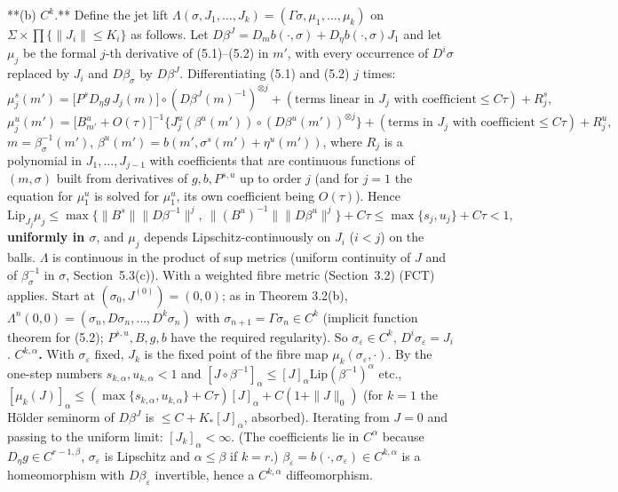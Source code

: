 \documentclass[11pt,a4paper]{article}
\theoremstyle{plain}
\theoremstyle{definition}
\theoremstyle{remark}
\numberwithin{equation}{section}
\numberwithin{figure}{section}
\begin{document}
**(b) $C^k$.** Define the jet lift $\Lambda(\sigma,J_1,\dots,J_k)=(\Gamma\sigma,\mu_1,\dots,\mu_k)$ on $\Sigma\times\prod\{\|J_i\|\le K_i\}$ as follows. Let $D\beta^J=D_mb(\cdot,\sigma)+D_\eta b(\cdot,\sigma)J_1$ and let $\mu_j$ be the formal $j$-th derivative of (5.1)–(5.2) in $m'$, with every occurrence of $D^i\sigma$ replaced by $J_i$ and $D\beta_\sigma$ by $D\beta^J$. Differentiating (5.1) and (5.2) $j$ times:
\[
\mu^s_j(m')=\big[P^sD_\eta g\,J_j(m)\big]\circ(D\beta^{J}(m)^{-1})^{\otimes j}+(\text{terms linear in }J_j\text{ with coefficient}\le C\tau)+R^s_j,
\]
\[
\mu^u_j(m')=\big[B^u_{m'}+O(\tau)\big]^{-1}\Big\{J_j^u(\beta^u(m'))\circ(D\beta^u(m'))^{\otimes j}\Big\}+(\text{terms in }J_j\text{ with coefficient}\le C\tau)+R^u_j,
\]
$m=\beta_\sigma^{-1}(m')$, $\beta^u(m')=b(m',\sigma^s(m')+\eta^u(m'))$, where $R_j$ is a polynomial in $J_1,\dots,J_{j-1}$ with coefficients that are continuous functions of $(m,\sigma)$ built from derivatives of $g,b,P^{s,u}$ up to order $j$ (and for $j=1$ the equation for $\mu^u_1$ is solved for $\mu^u_1$, its own coefficient being $O(\tau)$). Hence
\[
\mathrm{Lip}_{J_j}\mu_j\le\max\{\|B^s\|\|D\beta^{-1}\|^j,\ \|(B^u)^{-1}\|\|D\beta^u\|^j\}+C\tau\le\max\{s_j,u_j\}+C\tau<1,
\]
\textbf{uniformly in $\sigma$}, and $\mu_j$ depends Lipschitz-continuously on $J_i$ ($i<j$) on the balls. $\Lambda$ is continuous in the product of sup metrics (uniform continuity of $J$ and of $\beta_\sigma^{-1}$ in $\sigma$, Section~5.3(c)). With a weighted fibre metric (Section~3.2) (FCT) applies. Start at $(\sigma_0,J^{(0)})=(0,0)$; as in Theorem 3.2(b), $\Lambda^n(0,0)=(\sigma_n,D\sigma_n,\dots,D^k\sigma_n)$ with $\sigma_{n+1}=\Gamma\sigma_n\in C^{k}$ (implicit function theorem for (5.2); $P^{s,u},B,g,b$ have the required regularity). So $\sigma_\varepsilon\in C^k$, $D^i\sigma_\varepsilon=J_i$.
\textbf{$C^{k,\alpha}$.} With $\sigma_\varepsilon$ fixed, $J_k$ is the fixed point of the fibre map $\mu_k(\sigma_\varepsilon,\cdot)$. By the one-step numbers $s_{k,\alpha},u_{k,\alpha}<1$ and $[J\circ\beta^{-1}]_\alpha\le[J]_\alpha\mathrm{Lip}(\beta^{-1})^\alpha$ etc., $[\mu_k(J)]_\alpha\le(\max\{s_{k,\alpha},u_{k,\alpha}\}+C\tau)[J]_\alpha+C(1+\|J\|_0)$ (for $k=1$ the Hölder seminorm of $D\beta^J$ is $\le C+K_*[J]_\alpha$, absorbed). Iterating from $J=0$ and passing to the uniform limit: $[J_k]_\alpha<\infty$. (The coefficients lie in $C^\alpha$ because $D_\eta g\in C^{r-1,\beta}$, $\sigma_\varepsilon$ is Lipschitz and $\alpha\le\beta$ if $k=r$.) $\beta_\varepsilon=b(\cdot,\sigma_\varepsilon)\in C^{k,\alpha}$ is a homeomorphism with $D\beta_\varepsilon$ invertible, hence a $C^{k,\alpha}$ diffeomorphism.
\end{document}
